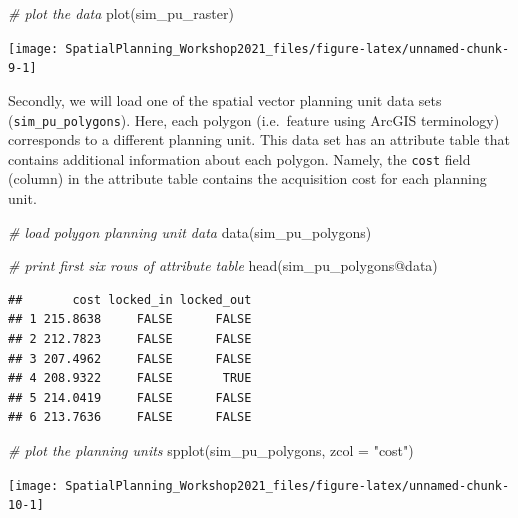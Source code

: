 \documentclass[
  12pt,
]{book}
\newenvironment{Shaded}{\begin{snugshade}}{\end{snugshade}}
\newcommand{\AttributeTok}[1]{\textcolor[rgb]{0.77,0.63,0.00}{#1}}
\newcommand{\CommentTok}[1]{\textcolor[rgb]{0.56,0.35,0.01}{\textit{#1}}}
\newcommand{\FunctionTok}[1]{\textcolor[rgb]{0.00,0.00,0.00}{#1}}
\newcommand{\NormalTok}[1]{#1}
\newcommand{\SpecialCharTok}[1]{\textcolor[rgb]{0.00,0.00,0.00}{#1}}
\newcommand{\StringTok}[1]{\textcolor[rgb]{0.31,0.60,0.02}{#1}}
\begin{document}
\begin{Shaded}
\begin{Highlighting}[]
\CommentTok{\# plot the data}
\FunctionTok{plot}\NormalTok{(sim\_pu\_raster)}
\end{Highlighting}
\end{Shaded}

\begin{center}\texttt{[image: SpatialPlanning\_Workshop2021\_files/figure-latex/unnamed-chunk-9-1]} \end{center}

Secondly, we will load one of the spatial vector planning unit data sets (\texttt{sim\_pu\_polygons}). Here, each polygon (i.e.~feature using ArcGIS terminology) corresponds to a different planning unit. This data set has an attribute table that contains additional information about each polygon. Namely, the \texttt{cost} field (column) in the attribute table contains the acquisition cost for each planning unit.

\begin{Shaded}
\begin{Highlighting}[]
\CommentTok{\# load polygon planning unit data}
\FunctionTok{data}\NormalTok{(sim\_pu\_polygons)}

\CommentTok{\# print first six rows of attribute table}
\FunctionTok{head}\NormalTok{(sim\_pu\_polygons}\SpecialCharTok{@}\NormalTok{data)}
\end{Highlighting}
\end{Shaded}

\begin{verbatim}
##       cost locked_in locked_out
## 1 215.8638     FALSE      FALSE
## 2 212.7823     FALSE      FALSE
## 3 207.4962     FALSE      FALSE
## 4 208.9322     FALSE       TRUE
## 5 214.0419     FALSE      FALSE
## 6 213.7636     FALSE      FALSE
\end{verbatim}

\begin{Shaded}
\begin{Highlighting}[]
\CommentTok{\# plot the planning units}
\FunctionTok{spplot}\NormalTok{(sim\_pu\_polygons, }\AttributeTok{zcol =} \StringTok{"cost"}\NormalTok{)}
\end{Highlighting}
\end{Shaded}

\begin{center}\texttt{[image: SpatialPlanning\_Workshop2021\_files/figure-latex/unnamed-chunk-10-1]} \end{center}
\end{document}
